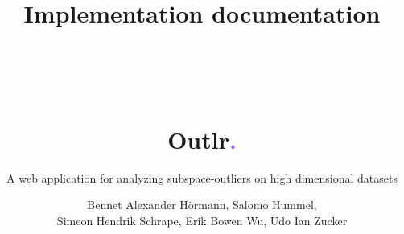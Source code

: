 \documentclass[11pt, english]{scrartcl}
\title{Implementation documentation\\~\\~\\~\\{\myfont Outlr\textcolor[HTML]{925FF0}{.}}}
\subtitle{A web application for analyzing subspace-outliers on high dimensional datasets}
\author{Bennet Alexander Hörmann, Salomo Hummel,\\
Simeon Hendrik Schrape, Erik Bowen Wu, Udo Ian Zucker}
\begin{document}
\maketitle\pagebreak

\tableofcontents\pagebreak









\begin{appendices}

\printglossary
\printglossary[type=\acronymtype]\clearpage %


\end{appendices}
\end{document}
